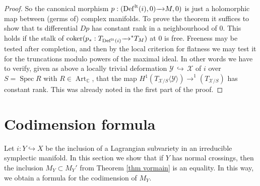 \documentclass[a4paper,11pt,final]{amsart}
\theoremstyle{plain}
\theoremstyle{definition}
\numberwithin{equation}{section}
\theoremstyle{remark}
\begin{document}
\begin{proof}
So the canonical morphism $p:({{\operatorname{Def}}}^{{\rm{lt}}}(i),0) {\xrightarrow{\ \ }}M,0)$ is just a holomorphic map between (germs of) complex manifolds. 
To prove the theorem it suffices to show that ts differential $Dp$ has constant rank in a neighbourhood of $0$.
This holds if the stalk of ${\operatorname{coker}}(p_*: T_{{{\operatorname{Def}}}^{{\rm{lt}}}(i)}{\xrightarrow{\ \ }}^* T_M)$ at $0$ is free. Freeness may be tested after completion, and then by the local criterion for flatness \cite[Thm A.5]{Se} we may test it for the truncations modulo powers of the maximal ideal. In other words we have to verify, given as above a locally trivial deformation ${{\mathcal Y}} {{\, \hookrightarrow\,}} {{\mathcal X}}$ of $i$ over $S={\operatorname{Spec}} R$ with $R\in {\operatorname{Art}}_{{\mathbb C}}$, that the map $H^1(T_{{{\mathcal X}}/S}\langle {{\mathcal Y}}\rangle) {\xrightarrow{\ \ }}^1(T_{{{\mathcal X}}/S})$ has constant rank. This was already noted in the first part of the proof.
\end{proof} 

\section{Codimension formula}\label{sec main}
Let $i: Y \hookrightarrow X$ be the inclusion of a Lagrangian subvariety in an irreducible symplectic manifold. In this section we show that if $Y$ has normal crossings, then the inclusion $M_Y\subset M_Y'$ from Theorem \ref{thm vormain} is an equality. In this way, we obtain a formula for the codimension of $M_Y$.
\end{document}
